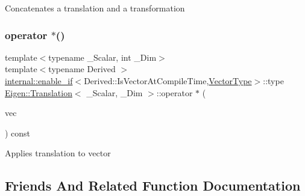 Concatenates a translation and a transformation \mbox{\label{class_eigen_1_1_translation_a11f1bd7eb645d784d7c8f9cb6faa25a6}} 
\subsubsection{\texorpdfstring{operator $\ast$()}{operator *()}\hspace{0.1cm}{\footnotesize\ttfamily [6/6]}}
{\footnotesize\ttfamily template$<$typename \+\_\+\+Scalar, int \+\_\+\+Dim$>$ \\
template$<$typename Derived $>$ \\
\mbox{\hyperlink{struct_eigen_1_1internal_1_1enable__if}{internal\+::enable\+\_\+if}}$<$Derived\+::\+Is\+Vector\+At\+Compile\+Time,\mbox{\hyperlink{class_eigen_1_1_translation_a339e17dfec5394ae563f62cca0df451f}{Vector\+Type}}$>$\+::type \mbox{\hyperlink{class_eigen_1_1_translation}{Eigen\+::\+Translation}}$<$ \+\_\+\+Scalar, \+\_\+\+Dim $>$\+::operator $\ast$ (\begin{DoxyParamCaption}\item[{const \mbox{\hyperlink{class_eigen_1_1_matrix_base}{Matrix\+Base}}$<$ Derived $>$ \&}]{vec }\end{DoxyParamCaption}) const\hspace{0.3cm}{\ttfamily [inline]}}

Applies translation to vector 

\subsection{Friends And Related Function Documentation}
\mbox{\label{class_eigen_1_1_translation_adca080f024dd6a80b880c07765c07768}} 
